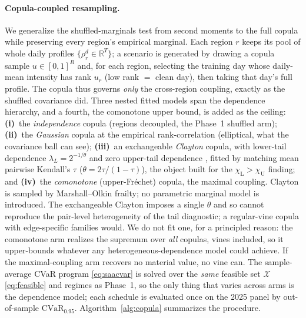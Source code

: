 \documentclass[12pt]{article}
\newcommand{\CVaR}{\mathrm{CVaR}}
\newcommand{\R}{\mathbb{R}}
\newcommand{\chiU}{\chi_{\mathrm{U}}}
\newcommand{\chiL}{\chi_{\mathrm{L}}}
\begin{document}
\paragraph{Copula-coupled resampling.} We generalize the shuffled-marginals test from
second moments to the full copula while preserving every region's empirical marginal.
Each region $r$ keeps its pool of whole daily profiles $\{\rho^d_r\in\R^T\}$; a
scenario is generated by drawing a copula sample $u\in[0,1]^R$ and, for each region,
selecting the training day whose daily-mean intensity has rank $u_r$ (low rank $=$
clean day), then taking that day's full profile. The copula thus governs \emph{only}
the cross-region coupling, exactly as the shuffled covariance did. Three nested fitted
models span the dependence hierarchy, and a fourth, the comonotone upper bound, is
added as the ceiling: \textbf{(i)}~the \emph{independence} copula (regions decoupled,
the Phase~1 shuffled arm); \textbf{(ii)}~the \emph{Gaussian} copula at the empirical
rank-correlation (elliptical, what the covariance ball can see); \textbf{(iii)}~an
exchangeable \emph{Clayton} copula, with lower-tail dependence
$\lambda_L=2^{-1/\theta}$ and zero upper-tail dependence \citep{joe2014}, fitted by
matching mean pairwise Kendall's $\tau$ ($\theta=2\tau/(1-\tau)$), the object built
for the $\chiL>\chiU$ finding; and \textbf{(iv)}~the \emph{comonotone} (upper-Fr\'echet)
copula, the maximal coupling. Clayton is sampled by Marshall--Olkin frailty; no
parametric marginal model is introduced. The exchangeable Clayton imposes a single
$\theta$ and so cannot reproduce the pair-level heterogeneity of the tail diagnostic; a
regular-vine copula with edge-specific families would. We do not fit one, for a
principled reason: the comonotone arm realizes the supremum over \emph{all} copulas,
vines included, so it upper-bounds whatever any heterogeneous-dependence model could
achieve. If the maximal-coupling arm recovers no material value, no vine can. The
sample-average CVaR program \eqref{eq:saacvar} is solved over the \emph{same} feasible
set $\mathcal X$ \eqref{eq:feasible} and regimes as Phase~1, so the only thing that
varies across arms is the dependence model; each schedule is evaluated once on the 2025
panel by out-of-sample $\CVaR_{0.95}$. Algorithm~\ref{alg:copula} summarizes the
procedure.
\end{document}
